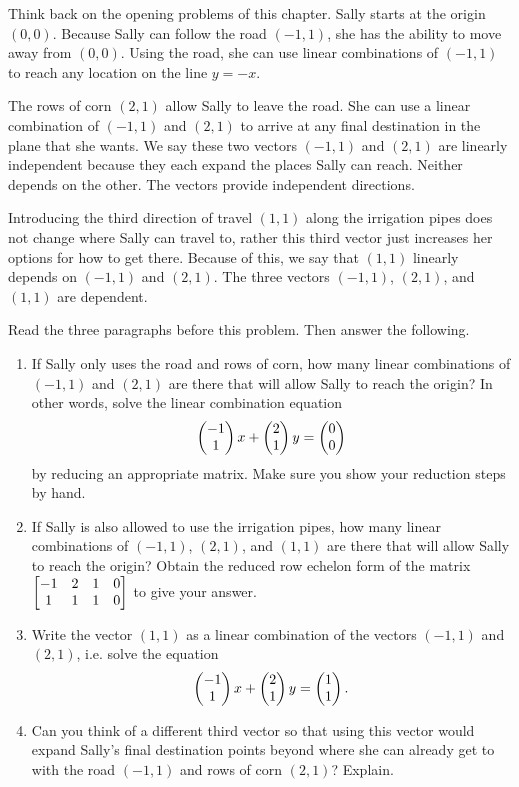 \mysubsection{\ideaind}

Think back on the opening problems of this chapter. Sally starts at the origin $(0,0)$.   
Because Sally can follow the road $(-1,1)$, she has the ability to move away from $(0,0)$. Using the road, she can use linear combinations of $(-1,1)$ to reach any location on the line $y=-x$. 

The rows of corn $(2,1)$ allow Sally to leave the road. 
She can use a linear combination of $(-1,1)$ and $(2,1)$ to arrive at any final destination in the plane that she wants. 
We say these two vectors $(-1,1)$ and $(2,1)$ are linearly independent because they each expand the places Sally can reach. Neither depends on the other. The vectors provide independent directions.
 
Introducing the third direction of travel $(1,1)$ along the irrigation pipes does not change where Sally can travel to, rather this third vector just increases her options for how to get there. Because of this, we say that $(1,1)$ linearly depends on $(-1,1)$ and $(2,1)$. The three vectors $(-1,1)$, $(2,1)$, and $(1,1)$ are dependent.

\begin{problem}
Read the three paragraphs before this problem. Then answer the following.
\begin{enumerate}
 \item If Sally only uses the road and rows of corn, how many linear combinations of $(-1,1)$ and $(2,1)$ are there that will allow Sally to reach the origin? In other words, solve the linear combination equation $$\begin{pmatrix} -1\\1 \end{pmatrix}x+\begin{pmatrix} 2\\1 \end{pmatrix}y = \begin{pmatrix} 0\\0 \end{pmatrix}$$ by reducing an appropriate matrix. Make sure you show your reduction steps by hand. 
 \item If Sally is also allowed to use the irrigation pipes, how many linear combinations of $(-1,1)$, $(2,1)$, and $(1,1)$ are there that will allow Sally to reach the origin? Obtain the reduced row echelon form of the matrix $\begin{bmatrix} -1&2&1&0\\1&1&1&0 \end{bmatrix}$ to give your answer.
 \item 
{}%
Write the vector $(1,1)$ as a linear combination of the vectors $(-1,1)$ and $(2,1)$, i.e. solve the equation  $$\begin{pmatrix} -1\\1 \end{pmatrix}x+\begin{pmatrix} 2\\1 \end{pmatrix}y = \begin{pmatrix} 1\\1 \end{pmatrix}.$$ 
 \item Can you think of a different third vector so that using this vector would expand Sally's final destination points beyond where she can already get to with the road $(-1,1)$ and rows of corn $(2,1)$? Explain.
\end{enumerate}

\end{problem}



